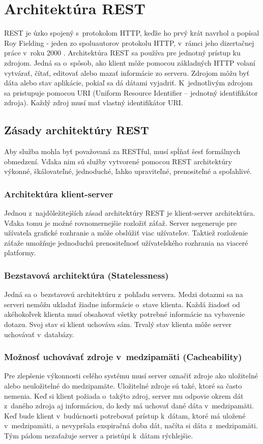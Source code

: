 \documentclass[../projekt.tex]{subfiles}
\begin{document}
\section{Architektúra REST}\label{rest}
REST je úzko spojený s~protokolom HTTP, keďže ho prvý krát navrhol a popísal Roy Fielding - jeden zo spoluautorov protokolu HTTP, v~rámci jeho dizertačnej práce v~roku 2000 \cite{dizertackaREST}.
Architektúra REST sa používa pre jednotný prístup ku zdrojom. Jedná sa o~spôsob, ako klient môže pomocou základných HTTP volaní vytvárať, čítať, editovať alebo mazať informácie zo serveru. Zdrojom môžu byť dáta alebo stav aplikácie, pokiaľ sa dá dátami vyjadriť. K~jednotlivým zdrojom sa pristupuje pomocou URI (Uniform Resource Identifier – jednotný identifikátor zdroja). Každý zdroj musí mať vlastný identifikátor URI.

\label{zasadyREST}
\subsection{Zásady architektúry REST}
Aby služba mohla byť považovaná za RESTful, musí spĺňať šesť formálnych obmedzení. Vďaka nim sú služby vytvorené pomocou REST architektúry výkonné, škálovateľné, jednoduché, ľahko upraviteľné, prenositeľné a spoľahlivé.

\subsubsection{Architektúra klient-server}
Jednou z~najdôležitejších zásad architektúry REST je klient-server architektúra. Vďaka tomu je možné rovnomernejšie rozložiť záťaž. Server negeneruje pre užívateľa grafické rozhranie a môže obslúžiť viac užívateľov. Taktiež rozloženie záťaže umožňuje jednoduchú prenositeľnosť užívateľského rozhrania na viaceré platformy.

\subsubsection{Bezstavová architektúra (Statelessness)}
Jedná sa o~bezstavovú architektúru z~pohľadu servera. Medzi dotazmi sa na serveri nemôžu ukladať žiadne informácie o~stave klienta. Každá žiadosť od akéhokoľvek klienta musí obsahovať všetky potrebné informácie na vybavenie dotazu. Svoj stav si klient uchováva sám. Trvalý stav klienta môže server uchovávať v~databázy.

\subsubsection{Možnosť uchovávať zdroje v~medzipamäti (Cacheability)}
Pre zlepšenie výkonnosti celého systému musí server označiť zdroje ako uložitelné alebo neuložitelné do medzipamäte. Uložitelné zdroje sú také, ktoré sa často nemenia. Keď si klient požiada o~takýto zdroj, server mu odpovie okrem dát z~daného zdroja aj informáciou, do kedy má uchovať dané dáta v~medzipamäti. Keď bude klient v~budúcnosti potrebovať prístup k~dátam, ktoré má uložené v~medzipamäti, a nevypršala exspiračná doba dát, načíta si dáta z~medzipamäti. Tým pádom nezaťažuje server a pristúpi k~dátam rýchlejšie. 
\end{document}
